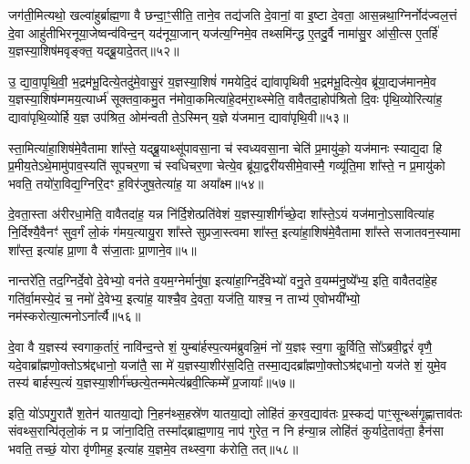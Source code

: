 जग॑ती॒मित्यथो॒ खल्वा॑हुर्ब्राह्म॒णा वै छन्दा॒ꣳ॒सीति॒ ताने॒व तद्य॑जति दे॒वानां॒ वा इ॒ष्टा दे॒वता॒ आस॒न्नथा॒ग्निर्नोद॑ज्वल॒त्तं दे॒वा आहु॑तीभिरनूया॒जेष्वन्व॑विन्द॒न् यद॑नूया॒जान् यज॑त्य॒ग्निमे॒व तथ्समि॑न्द्ध ए॒तदु॒र्वै नामा॑सु॒र आ॑सी॒त्स ए॒तर्\mbox{}हि॑ य॒ज्ञस्या॒शिष॑मवृङ्क्त॒ यद्ब्रू॒यादे॒तत्॥५२॥

उ॒ द्या॒वा॒पृ॒थि॒वी॒ भ॒द्रम॑भू॒दित्ये॒तदु॑मे॒वासु॒रं य॒ज्ञस्या॒शिषं॑ गमयेदि॒दं द्या॑वापृथिवी भ॒द्रम॑भू॒दित्ये॒व ब्रू॑या॒द्यज॑मानमे॒व य॒ज्ञस्या॒शिष॑म्गमय॒त्यार्ध्म॑ सूक्तवा॒कमु॒त न॑मोवा॒कमित्या॑हे॒दम॑रा॒थ्स्मेति॒ वावैतदा॒होप॑श्रितो दि॒वः पृ॑थि॒व्योरित्या॑ह॒ द्यावा॑पृथि॒व्योर्\mbox{}हि य॒ज्ञ उप॑श्रित॒ ओम॑न्वती ते॒\-ऽस्मिन् य॒ज्ञे य॑जमान॒ द्यावा॑पृथि॒वी॥५३॥

स्ता॒मित्या॑हा॒शिष॑मे॒वैतामा शा᳚स्ते॒ यद्ब्रू॒याथ्सू॑पावसा॒ना च॑ स्वध्यवसा॒ना चेति॑ प्र॒मायु॑को॒ यज॑मानः स्याद्य॒दा हि प्र॒मीय॒ते\-ऽथे॒मामु॑पाव॒स्यति॑ सूपचर॒णा च॑ स्वधिचर॒णा चेत्ये॒व ब्रू॑या॒द्वरी॑यसीमे॒वास्मै॒ गव्यू॑ति॒मा शा᳚स्ते॒ न प्र॒मायु॑को भवति॒ तयो॑रा॒विद्य॒ग्निरि॒दꣳ ह॒विर॑जुष॒तेत्या॑ह॒ या अया᳚क्ष्म॥५४॥

दे॒वता॒स्ता अ॑रीरधा॒मेति॒ वावैतदा॑ह॒ यन्न नि॑र्दि॒शेत्प्रति॑वेशं य॒ज्ञस्या॒शीर्ग॑च्छे॒दा शा᳚स्ते॒\-ऽयं यज॑मानो॒\-ऽसावित्या॑ह नि॒र्दिश्यै॒वैनꣳ॑ सुव॒र्गं लो॒कं ग॑मय॒त्यायु॒रा शा᳚स्ते सुप्रजा॒स्त्वमा शा᳚स्त॒ इत्या॑हा॒शिष॑मे॒वैतामा शा᳚स्ते सजातवन॒स्यामा शा᳚स्त॒ इत्या॑ह प्रा॒णा वै स॑जा॒ताः प्रा॒णाने॒व॥५॥

नान्तरे॑ति॒ तद॒ग्निर्दे॒वो दे॒वेभ्यो॒ वन॑ते व॒यम॒ग्नेर्मानु॑षा॒ इत्या॑हा॒ग्निर्दे॒वेभ्यो॑ वनु॒ते व॒यम्म॑नु॒ष्ये᳚भ्य॒ इति॒ वावैतदा॑हे॒ह गति॑र्वा॒मस्ये॒दं च॒ नमो॑ दे॒वेभ्य॒ इत्या॑ह॒ याश्चै॒व दे॒वता॒ यज॑ति॒ याश्च॒ न ताभ्य॑ ए॒वोभयी᳚भ्यो॒ नम॑स्करोत्या॒त्मनो\-ऽना᳚र्त्यै॥५६॥

{\anuvakamend[{श्रि॒तस्ते॒ प्र त्रि॒ष्टुभ॑मे॒तद्द्यावा॑पृथि॒वी या अया᳚क्ष्म प्रा॒णाने॒व षट्च॑त्वारिꣳशच्च॥९॥}]}

दे॒वा वै य॒ज्ञस्य॑ स्वगाक॒र्तारं॒ नावि॑न्द॒न्ते शं॒ युम्बा॑र्\mbox{}हस्प॒त्यम॑ब्रुवन्नि॒मं नो॑ य॒ज्ञꣴ स्व॒गा कु॒र्विति॒ सो᳚\-ऽब्रवी॒द्वरं॑ वृणै॒ यदे॒वाब्रा᳚ह्मणो॒क्तो\-ऽश्र॑द्दधानो॒ यजा॑तै॒ सा मे॑ य॒ज्ञस्या॒शीर॑स॒दिति॒ तस्मा॒द्यदब्रा᳚ह्मणो॒क्तो\-ऽश्र॑द्दधानो॒ यज॑ते शं॒ युमे॒व तस्य॑ बार्\mbox{}हस्प॒त्यं य॒ज्ञस्या॒शीर्ग॑च्छत्ये॒तन्ममेत्य॑ब्रवी॒त्किम्मे᳚ प्र॒जायाः᳚॥५७॥

इति॒ यो॑\-ऽपगु॒रातै॑ श॒तेन॑ यातया॒द्यो नि॒हन॑थ्स॒हस्रे॑ण यातया॒द्यो लोहि॑तं क॒रव॒द्याव॑तः प्र॒स्कद्य॑ पाꣳ॒सून्थ्सं॑गृ॒ह्णात्ताव॑तः संवथ्स॒रान्पि॑तृलो॒कं न प्र जा॑ना॒दिति॒ तस्मा᳚द्ब्राह्म॒णाय॒ नाप॑ गुरेत॒ न नि ह॑न्या॒न्न लोहि॑तं कुर्यादे॒ताव॑ता॒ हैन॑सा भवति॒ तच्छं॒ योरा वृ॑णीमह॒ इत्या॑ह य॒ज्ञमे॒व तथ्स्व॒गा क॑रोति॒ तत्॥५८॥

